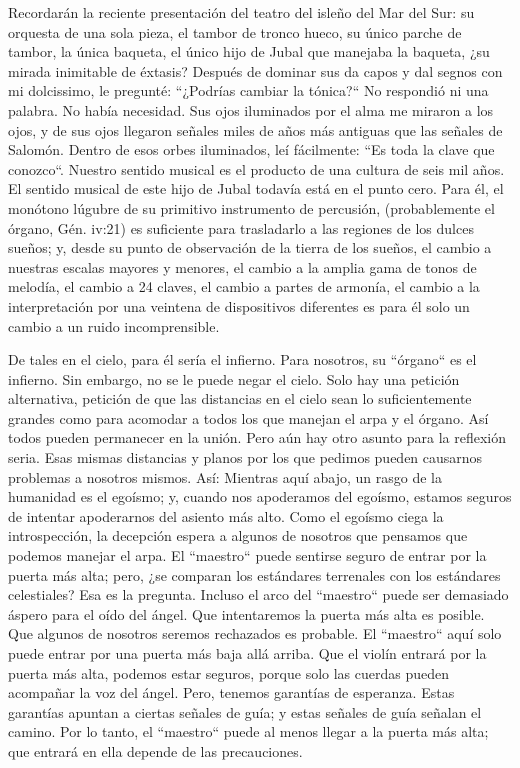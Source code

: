 \documentclass[12pt]{book}
\begin{document}
Recordarán la reciente presentación del teatro del isleño del Mar del Sur: su orquesta de una sola pieza, el tambor de tronco hueco, su único parche de tambor, la única baqueta, el único hijo de Jubal que manejaba la baqueta, ¿su mirada inimitable de éxtasis? Después de dominar sus da capos y dal segnos con mi dolcissimo, le pregunté: ``¿Podrías cambiar la tónica?`` No respondió ni una palabra. No había necesidad. Sus ojos iluminados por el alma me miraron a los ojos, y de sus ojos llegaron señales miles de años más antiguas que las señales de Salomón. Dentro de esos orbes iluminados, leí fácilmente: ``Es toda la clave que conozco``. Nuestro sentido musical es el producto de una cultura de seis mil años. El sentido musical de este hijo de Jubal todavía está en el punto cero. Para él, el monótono lúgubre de su primitivo instrumento de percusión, (probablemente el órgano, Gén. iv:21) es suficiente para trasladarlo a las regiones de los dulces sueños; y, desde su punto de observación de la tierra de los sueños, el cambio a nuestras escalas mayores y menores, el cambio a la amplia gama de tonos de melodía, el cambio a 24 claves, el cambio a partes de armonía, el cambio a la interpretación por una veintena de dispositivos diferentes es para él solo un cambio a un ruido incomprensible.

De tales en el cielo, para él sería el infierno. Para nosotros, su ``órgano`` es el infierno. Sin embargo, no se le puede negar el cielo. Solo hay una petición alternativa, petición de que las distancias en el cielo sean lo suficientemente grandes como para acomodar a todos los que manejan el arpa y el órgano. Así todos pueden permanecer en la unión. Pero aún hay otro asunto para la reflexión seria. Esas mismas distancias y planos por los que pedimos pueden causarnos problemas a nosotros mismos. Así: Mientras aquí abajo, un rasgo de la humanidad es el egoísmo; y, cuando nos apoderamos del egoísmo, estamos seguros de intentar apoderarnos del asiento más alto. Como el egoísmo ciega la introspección, la decepción espera a algunos de nosotros que pensamos que podemos manejar el arpa. El ``maestro`` puede sentirse seguro de entrar por la puerta más alta; pero, ¿se comparan los estándares terrenales con los estándares celestiales? Esa es la pregunta. Incluso el arco del ``maestro`` puede ser demasiado áspero para el oído del ángel. Que intentaremos la puerta más alta es posible. Que algunos de nosotros seremos rechazados es probable. El ``maestro`` aquí solo puede entrar por una puerta más baja allá arriba. Que el violín entrará por la puerta más alta, podemos estar seguros, porque solo las cuerdas pueden acompañar la voz del ángel. Pero, tenemos garantías de esperanza. Estas garantías apuntan a ciertas señales de guía; y estas señales de guía señalan el camino. Por lo tanto, el ``maestro`` puede al menos llegar a la puerta más alta; que entrará en ella depende de las precauciones.
\end{document}
